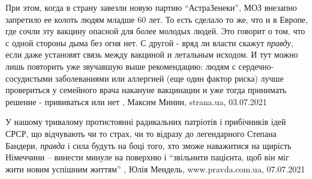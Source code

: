 При этом, когда в страну завезли новую партию \enquote{АстраЗенеки}, МОЗ
внезапно запретило ее колоть людям младше 60 лет. То есть сделало то же, что и
в Европе, где сочли эту вакцину опасной для более молодых людей.  Это говорит о
том, что с одной стороны дыма без огня нет. С другой - вряд ли власти скажут
\emph{правду}, если даже установят связь между вакциной и летальным исходом.  И
тут можно лишь повторить уже звучавшую выше рекомендацию: людям с
сердечно-сосудистыми заболеваниями или аллергией (еще один фактор риска) лучше
провериться у семейного врача накануне вакцинации и уже тогда принимать решение
- прививаться или нет
, 
Максим Минин, strana.ua, 03.07.2021

У нашому тривалому протистоянні радикальних патріотів і прибічників ідей СРСР,
що відчувають чи то страх, чи то відразу до легендарного Степана Бандери,
\emph{правда} і сила будуть на боці того, хто зможе наважитися на щирість
Німеччини – винести минуле на поверхню і \enquote{звільнити пацієнта, щоб він
міг жити новим успішним життям} 
, 
Юлія Мендель, www.pravda.com.ua, 07.07.2021

